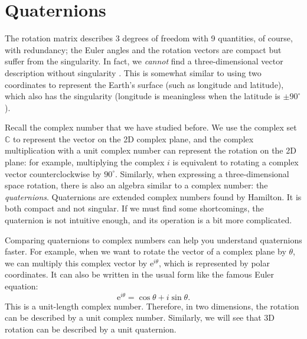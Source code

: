 \section{Quaternions}
The rotation matrix describes 3 degrees of freedom with 9 quantities, of course, with redundancy; the Euler angles and the rotation vectors are compact but suffer from the singularity. In fact, we \textit{cannot} find a three-dimensional vector description without singularity \cite{Stuelpnagel1964}. This is somewhat similar to using two coordinates to represent the Earth's surface (such as longitude and latitude), which also has the singularity (longitude is meaningless when the latitude is $ \pm  90 ^ \circ $ ).

Recall the complex number that we have studied before. We use the complex set $ \mathbb {C} $ to represent the vector on the 2D complex plane, and the complex multiplication with a unit complex number can represent the rotation on the 2D plane: for example, multiplying the complex $i$ is equivalent to rotating a complex vector counterclockwise by $ 90 ^ \circ $. Similarly, when expressing a three-dimensional space rotation, there is also an algebra similar to a complex number: the \textit{quaternions}. Quaternions are extended complex numbers found by Hamilton. It is both compact and not singular. If we must find some shortcomings, the quaternion is not intuitive enough, and its operation is a bit more complicated.

Comparing quaternions to complex numbers can help you understand quaternions faster. For example, when we want to rotate the vector of a complex plane by $\theta$, we can multiply this complex vector by $\mathrm{e}^{i \theta}$, which is represented by polar coordinates. It can also be written in the usual form like the famous Euler equation:
\begin{equation}
\mathrm{e}^{i\theta} = \cos \theta + i \sin \theta.
\end{equation}
This is a unit-length complex number. Therefore, in two dimensions, the rotation can be described by a unit complex number. Similarly, we will see that 3D rotation can be described by a unit quaternion.


